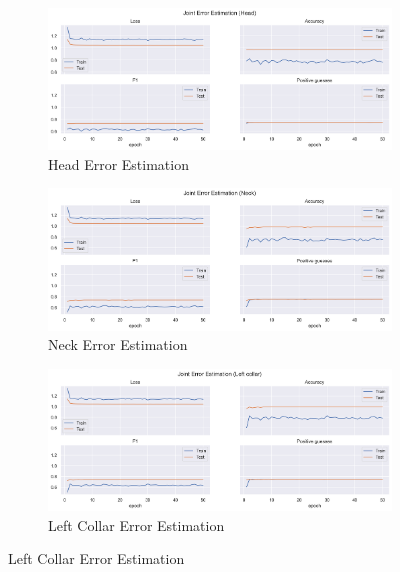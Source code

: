 \begin{figure}[!htbp]
  \centering
  \begin{subfigure}[b]{0.47\linewidth}
      \centering
      \includegraphics[width=\textwidth]{figures/Results/v1/jt/Head_ErrorEstimation.png}
      \caption{Head Error Estimation}
      \label{fig:v1_head_jt_ee}
  \end{subfigure}
  \hfill
  \begin{subfigure}[b]{0.47\linewidth}
      \centering
      \includegraphics[width=\textwidth]{figures/Results/v1/jt/Neck_ErrorEstimation.png}
      \caption{Neck Error Estimation}
      \label{fig:v1_neck_jt_ee}
  \end{subfigure}
  \hfill
  \begin{subfigure}[b]{0.47\linewidth}
      \centering
      \includegraphics[width=\textwidth]{figures/Results/v1/jt/Left collar_ErrorEstimation.png}
      \caption{Left Collar Error Estimation}

\end{subfigure}
\end{figure}
